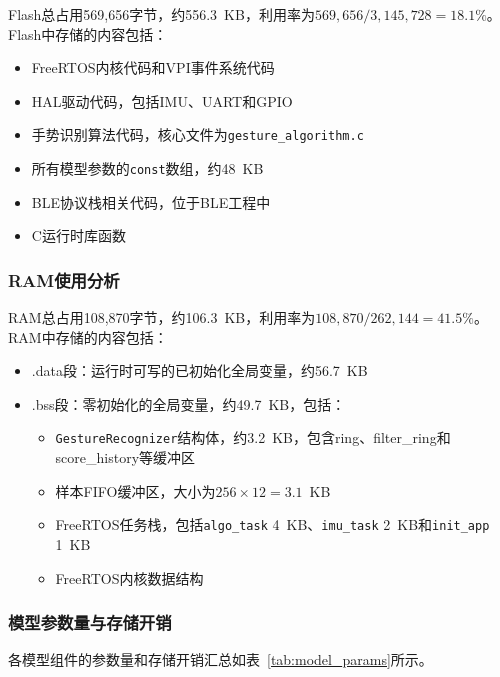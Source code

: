 \documentclass[lettersize,journal]{IEEEtran}
\begin{document}
Flash总占用569,656字节，约556.3~KB，利用率为$569,656 / 3,145,728 = 18.1\%$。Flash中存储的内容包括：
\begin{itemize}[leftmargin=*]
    \item FreeRTOS内核代码和VPI事件系统代码
    \item HAL驱动代码，包括IMU、UART和GPIO
    \item 手势识别算法代码，核心文件为\texttt{gesture\_algorithm.c}
    \item 所有模型参数的\texttt{const}数组，约48~KB
    \item BLE协议栈相关代码，位于BLE工程中
    \item C运行时库函数
\end{itemize}

\subsubsection{RAM使用分析}

RAM总占用108,870字节，约106.3~KB，利用率为$108,870 / 262,144 = 41.5\%$。RAM中存储的内容包括：
\begin{itemize}[leftmargin=*]
    \item .data段：运行时可写的已初始化全局变量，约56.7~KB
    \item .bss段：零初始化的全局变量，约49.7~KB，包括：
    \begin{itemize}
        \item \texttt{GestureRecognizer}结构体，约3.2~KB，包含ring、filter\_ring和score\_history等缓冲区
        \item 样本FIFO缓冲区，大小为$256 \times 12 = 3.1$~KB
        \item FreeRTOS任务栈，包括\texttt{algo\_task} 4~KB、\texttt{imu\_task} 2~KB和\texttt{init\_app} 1~KB
        \item FreeRTOS内核数据结构
    \end{itemize}
\end{itemize}

\subsubsection{模型参数量与存储开销}

各模型组件的参数量和存储开销汇总如表~\ref{tab:model_params}所示。
\end{document}
